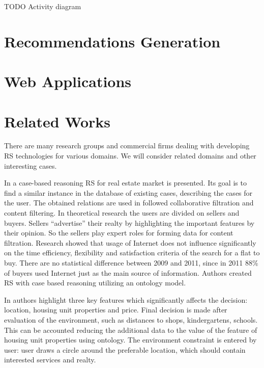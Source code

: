 \documentclass[conference,a4]{IEEEtran}
\begin{document}
TODO Activity diagram %

\section{Recommendations Generation}
\label{sec:proc-recs}






\section{Web Applications}

\section{Related Works}

There are many research groups and commercial firms dealing with developing RS technologies for various domains.  We will consider related domains and other interesting cases.

In \cite{br22} a case-based reasoning RS for real estate market is presented.  Its goal is to find a similar instance in the database of existing cases, describing the cases for the user.  The obtained relations are used in followed collaborative filtration and content filtering.  In theoretical research \cite{br20} the users are divided on sellers and buyers.  Sellers ``advertise'' their realty by highlighting the important features by their opinion.  So the sellers play expert roles for forming data for content filtration.  Research \cite{br23} showed that usage of Internet does not influence significantly on the time efficiency, flexibility and satisfaction criteria of the search for a flat to buy.  There are no statistical difference between 2009 and 2011, since in 2011 88\% of buyers used Internet just as the main source of information.  Authors created RS with case based reasoning utilizing an ontology model.

In \cite{br23} authors highlight three key features which significantly affects the decision: location, housing unit properties and price.  Final decision is made after evaluation of the environment, such as distances to shops, kindergartens, schools.  This can be accounted reducing the additional data to the value of the feature of housing unit properties using ontology.  The environment constraint is entered by user: user draws a circle around the preferable location, which should contain interested services and realty.
\end{document}

